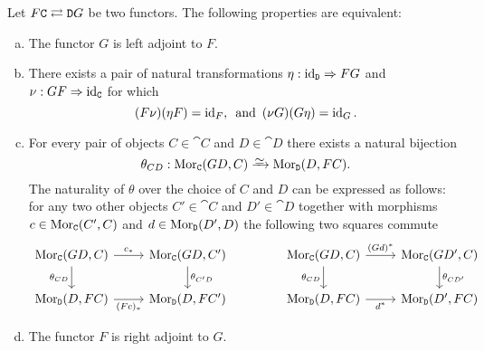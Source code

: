 \begin{theorem}
    \label{thm:equivalent-defs-adjoint-pair}
    Let \(F \relax \texttt C \rightleftarrows \texttt D \relax G\) be two functors. The following
    properties are equivalent:
    \begin{enumerate}[(a)]\setlength\itemsep{0em}
        \item The functor \(G\) is left adjoint to \(F\).
        \item There exists a pair of natural transformations
              \(\eta: \operatorname{id}_{\texttt D} \Rightarrow F G\) and \(\nu: G F \Rightarrow \operatorname{id}_{\texttt C}\) for which
              \[
                  (F \nu) (\eta F) = \operatorname{id}_F,\,
                  \text{ and }\,
                  (\nu G) (G \eta) = \operatorname{id}_G.
              \]

        \item For every pair of objects \(C \in \cat C\) and \(D \in \cat D\) there exists a
              natural bijection
              \[
                  \theta_{C D}: \Mor_{\cat C}(G D, C) \isoto \Mor_{\cat D}(D, F C).
              \]
              The naturality of \(\theta\) over the choice of \(C\) and \(D\) can be expressed as
              follows: for any two other objects \(C' \in \cat C\) and \(D' \in \cat D\)
              together with morphisms \(c \in \operatorname{Mor}_{\texttt C}(C', C)\) and \(d \in \operatorname{Mor}_{\texttt
                  D}(D', D)\) the following two squares commute
              \[
                  \begin{tikzcd}
                      \Mor_{\cat C}(G D, C) \ar[r, "c_{*}"] \ar[d, "\theta_{C D}"']
                      &\Mor_{\cat C}(G D, C') \ar[d, "\theta_{C' D}"]
                      \\
                      \Mor_{\cat D}(D, F C) \ar[r, "{(F c)_{*}}"']
                      &\Mor_{\cat D}(D, F C')
                  \end{tikzcd}
                  \qquad
                  \qquad
                  \begin{tikzcd}
                      \Mor_{\cat C}(G D, C) \ar[r, "(G d)^{*}"]
                      \ar[d, "\theta_{C D}"']
                      &\Mor_{\cat C}(G D', C) \ar[d, "\theta_{C D'}"]
                      \\
                      \Mor_{\cat D}(D, F C) \ar[r, "{d^{*}}"']
                      &\Mor_{\cat D}(D', F C)
                  \end{tikzcd}
              \]

        \item The functor \(F\) is right adjoint to \(G\).
    \end{enumerate}
\end{theorem}

